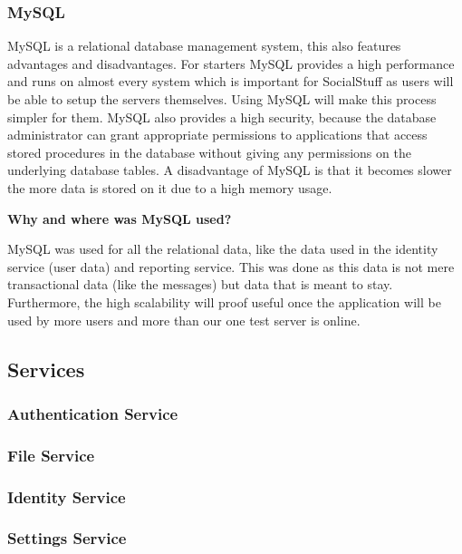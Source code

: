 \subsubsection{MySQL}
MySQL is a relational database management system, this also features advantages and disadvantages.
For starters MySQL provides a high performance and runs on almost every system which is important for SocialStuff as
users will be able to setup the servers themselves.
Using MySQL will make this process simpler for them.
MySQL also provides a high security, because the database administrator can grant appropriate permissions to
applications that access stored procedures in the database without giving any permissions on the underlying database
tables.
A disadvantage of MySQL is that it becomes slower the more data is stored on it due to a high memory usage.

\textbf{Why and where was MySQL used?}

MySQL was used for all the relational data, like the data used in the identity service (user data) and reporting
service.
This was done as this data is not mere transactional data (like the messages) but data that is meant to stay.
Furthermore, the high scalability will proof useful once the application will be used by more users and more than our
one test server is online.

\subsection{Services}\label{subsec:services2}

\subsubsection{Authentication Service}

\subsubsection{File Service}

\subsubsection{Identity Service}
\label{subsubsec:identitySer}

\subsubsection{Settings Service}\label{subsubsec:settingsSer}

